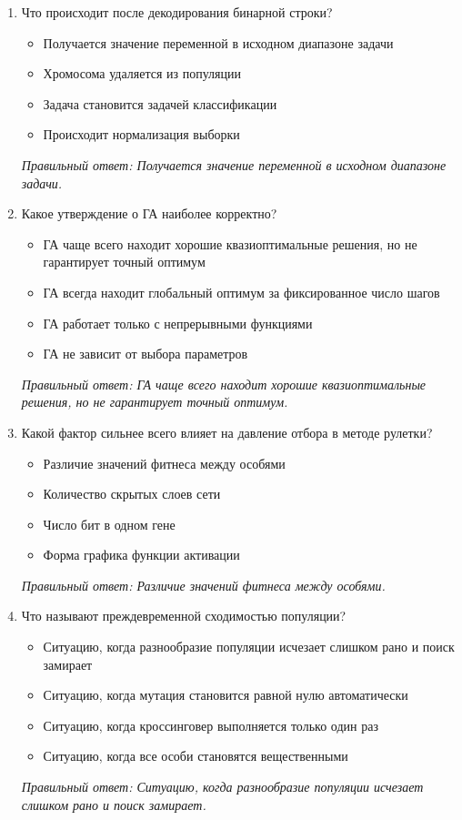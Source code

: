 \begin{enumerate}[label=\textbf{\arabic*.}, leftmargin=0pt, itemsep=1.2em]
\item Что происходит после декодирования бинарной строки?
\begin{itemize}[label=$\square$, leftmargin=1.5cm, itemsep=0.2em, topsep=0.3em]
\item Получается значение переменной в исходном диапазоне задачи
\item Хромосома удаляется из популяции
\item Задача становится задачей классификации
\item Происходит нормализация выборки
\end{itemize}
{\small\textit{Правильный ответ: Получается значение переменной в исходном диапазоне задачи.}}

\item Какое утверждение о ГА наиболее корректно?
\begin{itemize}[label=$\square$, leftmargin=1.5cm, itemsep=0.2em, topsep=0.3em]
\item ГА чаще всего находит хорошие квазиоптимальные решения, но не гарантирует точный оптимум
\item ГА всегда находит глобальный оптимум за фиксированное число шагов
\item ГА работает только с непрерывными функциями
\item ГА не зависит от выбора параметров
\end{itemize}
{\small\textit{Правильный ответ: ГА чаще всего находит хорошие квазиоптимальные решения, но не гарантирует точный оптимум.}}

\item Какой фактор сильнее всего влияет на давление отбора в методе рулетки?
\begin{itemize}[label=$\square$, leftmargin=1.5cm, itemsep=0.2em, topsep=0.3em]
\item Различие значений фитнеса между особями
\item Количество скрытых слоев сети
\item Число бит в одном гене
\item Форма графика функции активации
\end{itemize}
{\small\textit{Правильный ответ: Различие значений фитнеса между особями.}}

\item Что называют преждевременной сходимостью популяции?
\begin{itemize}[label=$\square$, leftmargin=1.5cm, itemsep=0.2em, topsep=0.3em]
\item Ситуацию, когда разнообразие популяции исчезает слишком рано и поиск замирает
\item Ситуацию, когда мутация становится равной нулю автоматически
\item Ситуацию, когда кроссинговер выполняется только один раз
\item Ситуацию, когда все особи становятся вещественными
\end{itemize}
{\small\textit{Правильный ответ: Ситуацию, когда разнообразие популяции исчезает слишком рано и поиск замирает.}}


\end{enumerate}
